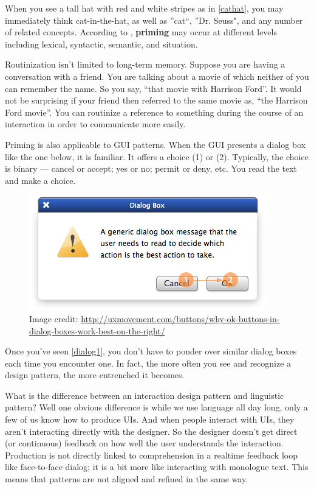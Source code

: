 When you see a tall hat with red and white stripes as in  \autoref{cathat},  you may immediately think cat-in-the-hat, as well as ''cat``, ''Dr. Seuss", and any number of related concepts. According to  \citep{Pickering:2003uy},  \textbf{priming} may occur at different levels including lexical, syntactic, semantic, and situation. 

Routinization isn't limited to long-term memory. Suppose you are having a conversation with a friend. You are talking about a movie of which neither of you can remember the name. So you say, ``that movie with Harrison Ford''. It would not be surprising if your friend then referred to the same movie as, ``the Harrison Ford movie''. You can routinize a reference to something during the course of an interaction in order to communicate more easily.

Priming is also applicable to GUI patterns. When the GUI presents a dialog box like the one below, it is familiar. It offers a choice (1) or (2). Typically, the choice is binary --- cancel or accept; yes or no; permit or deny, etc. You read the text and make a choice. 


\begin{figure}
\centerline{
\includegraphics[scale=.5]{chapter8.tex/dialog1}
}
\caption{Image credit: \url{http://uxmovement.com/buttons/why-ok-buttons-in-dialog-boxes-work-best-on-the-right/}}
\label{dialog1}
\end{figure}


Once you've seen  \autoref{dialog1},  you don't have to ponder over similar dialog boxes each time you encounter one. In fact, the more often you see and recognize a design pattern, the more entrenched it becomes. 

What is the difference between an interaction design pattern and linguistic pattern? Well one obvious difference is while we use language all day long, only a few of us know how to produce UIs. And when people interact with UIs, they aren't interacting directly with the designer. So the designer doesn't get direct (or continuous) feedback on how well the user understands the interaction. Production is not directly linked to comprehension in a realtime feedback loop like face-to-face dialog; it is a bit more like interacting with monologue text. This means that patterns are not aligned and refined in the same way. 


